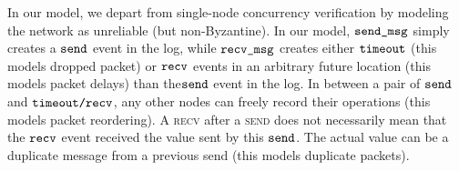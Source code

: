 In our model, we depart from single-node concurrency verification by modeling the network as unreliable (but non-Byzantine). 
In our model, ${\mathrm{\texttt{send\_msg}}}$ simply creates a ${\mathrm{\texttt{send}}}$ event in the log, 
while ${\mathrm{\texttt{recv\_msg}}}$ creates either ${\mathrm{\texttt{timeout}}}$ (this models dropped packet) or ${\mathrm{\texttt{recv}}}$ 
events in an arbitrary future location (this models packet delays) than the${\mathrm{\texttt{send}}}$ event in the log. 
In between a pair of ${\mathrm{\texttt{send}}}$ and ${\mathrm{\texttt{timeout/recv}}}$, 
any other nodes can freely record their operations (this models packet reordering). 
A \textsc{recv} after a \textsc{send} does not necessarily mean that the ${\mathrm{\texttt{recv}}}$ event received the value sent by this ${\mathrm{\texttt{send}}}$. 
The actual value can be a duplicate message from a previous send (this models duplicate packets).


